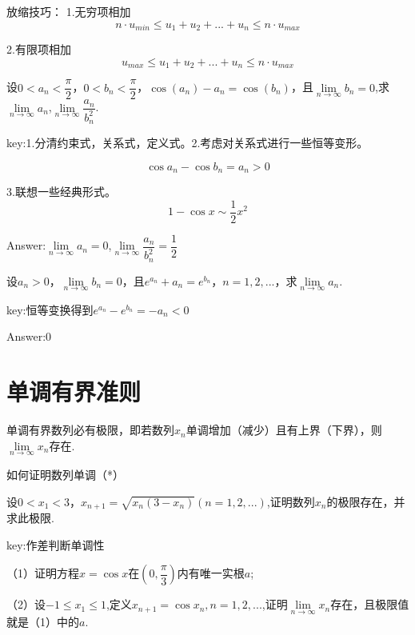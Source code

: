 \documentclass[12pt, a4paper, oneside]{ctexbook}
\begin{document}
放缩技巧：
1.无穷项相加
\[n\cdot u_{min}\leq u_1+u_2+...+u_n \leq n\cdot u_{max}\]

2.有限项相加
\[u_{max}\leq u_1+u_2+...+u_n \leq n\cdot u_{max} \]


\hspace*{\fill}

设$0<a_n<\dfrac{\pi}{2}$，$0<b_n<\dfrac{\pi}{2}$，$\cos(a_n)-a_n=\cos(b_n)$，且$\lim\limits_{n \to \infty}b_n=0$,求$\lim\limits_{n \to \infty}a_n$,$\lim\limits_{n \to \infty}{\dfrac{a_n}{b_n^2}}$.

\hspace*{\fill}

key:1.分清约束式，关系式，定义式。2.考虑对关系式进行一些恒等变形。

\[\cos a_n -\cos b_n = a_n >0\]


3.联想一些经典形式。\[1-\cos x \sim \dfrac{1}{2}x^2\]

Answer:$\lim\limits_{n \to \infty}a_n=0$,$\lim\limits_{n \to \infty}{\dfrac{a_n}{b_n^2}}=\dfrac{1}{2}$


\hspace*{\fill}

设$a_n>0$，$\lim\limits_{n \to \infty}b_n = 0$，且$e^{a_n}+a_n=e^{b_n}$，$n=1,2,...$，求$\lim\limits_{n \to \infty}a_n$.

key:恒等变换得到$e^{a_n}-e^{b_n}=-a_n<0$

Answer:0

\section{单调有界准则}

单调有界数列必有极限，即若数列{$x_n$}单调增加（减少）且有上界（下界），则$\lim\limits_{n \to \infty}x_n$存在.

\hspace*{\fill}

如何证明数列单调（*）

\hspace*{\fill}

设$0<x_1<3$，$x_{n+1}=\sqrt{x_n(3-x_n)}(n=1,2,...)$,证明数列{$x_n$}的极限存在，并求此极限.

key:作差判断单调性

\hspace*{\fill}

（1）证明方程$x=\cos x$在$(0,\dfrac{\pi}{3})$内有唯一实根$a$;

（2）设$-1\leq x_1 \leq 1$,定义$x_{n+1}=\cos x_n,n=1,2,...$,证明$\lim\limits_{n \to \infty}x_n$存在，且极限值就是（1）中的$a$.
\end{document}
